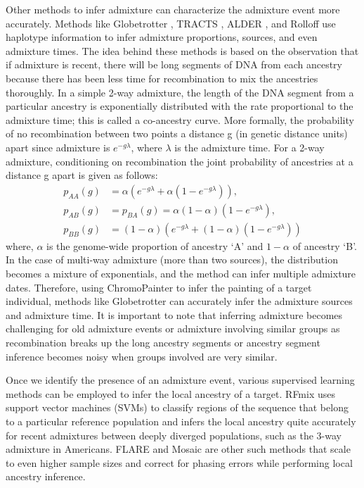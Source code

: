 Other methods to infer admixture can characterize the admixture event more accurately. Methods like Globetrotter \cite{hellenthal2014genetic}, TRACTS \cite{gravel2012population}, ALDER \cite{loh2013inferring}, and Rolloff \cite{moorjani2011history, patterson2012ancient} use haplotype information to infer admixture proportions, sources, and even admixture times. The idea behind these methods is based on the observation that if admixture is recent, there will be long segments of DNA from each ancestry because there has been less time for recombination to mix the ancestries thoroughly. In a simple 2-way admixture, the length of the DNA segment from a particular ancestry is exponentially distributed with the rate proportional to the admixture time; this is called a co-ancestry curve. More formally, the probability of no recombination between two points a distance g (in genetic distance units) apart since admixture is $e^{-g\lambda}$, where $\lambda$ is the admixture time. For a 2-way admixture, conditioning on recombination the joint probability of ancestries at a distance g apart is given as follows:
\begin{equation}
\begin{aligned}
    p_{AA}(g) &= \alpha ( e^{-g\lambda} + \alpha (1-e^{-g\lambda} )), \\
    p_{AB}(g) &= p_{BA}(g) = \alpha (1 - \alpha) (1 - e^{-g\lambda}), \\
    p_{BB}(g) &= (1-\alpha) ( e^{-g\lambda} + (1-\alpha) (1-e^{-g\lambda} ))
\end{aligned}
\end{equation}
where, $\alpha$ is the genome-wide proportion of ancestry `A' and $1-\alpha$ of ancestry `B'. In the case of multi-way admixture (more than two sources), the distribution becomes a mixture of exponentials, and the method can infer multiple admixture dates. Therefore, using ChromoPainter to infer the painting of a target individual, methods like Globetrotter can accurately infer the admixture sources and admixture time. It is important to note that inferring admixture becomes challenging for old admixture events or admixture involving similar groups as recombination breaks up the long ancestry segments or ancestry segment inference becomes noisy when groups involved are very similar.

Once we identify the presence of an admixture event, various supervised learning methods can be employed to infer the local ancestry of a target. RFmix \cite{maples2013rfmix} uses support vector machines (SVMs) to classify regions of the sequence that belong to a particular reference population and infers the local ancestry quite accurately for recent admixtures between deeply diverged populations, such as the 3-way admixture in Americans. FLARE \cite{browning2023fast} and Mosaic \cite{salter2019fine} are other such methods that scale to even higher sample sizes and correct for phasing errors while performing local ancestry inference.

